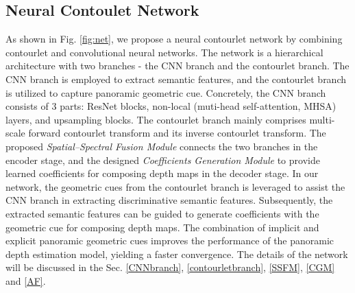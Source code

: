 \documentclass[10pt,times,mathptm,psfig,twocolumn,journals]{IEEEtran}
\begin{document}
\subsection{Neural Contoulet Network}
\label{NCN}
As shown in Fig. \ref{fig:net}, we propose a neural contourlet network by combining contourlet and convolutional neural networks. The network is a hierarchical architecture with two branches - the CNN branch and the contourlet branch. The CNN branch is employed to extract semantic features, and the contourlet branch is utilized to capture panoramic geometric cue. Concretely, the CNN branch consists of 3 parts: ResNet blocks, non-local (muti-head self-attention, MHSA) layers, and upsampling blocks. The contourlet branch mainly comprises multi-scale forward contourlet transform and its inverse contourlet transform. The proposed \textit{Spatial–Spectral Fusion Module} connects the two branches in the encoder stage, and the designed \textit{Coefficients Generation Module} to provide learned coefficients for composing depth maps in the decoder stage. 
In our network, the geometric cues from the contourlet branch is leveraged to assist the CNN branch in extracting discriminative semantic features. Subsequently, the extracted semantic features can be guided to generate coefficients with the geometric cue for composing depth maps.
The combination of implicit and explicit panoramic geometric cues improves the performance of the panoramic depth estimation model, yielding a faster convergence. The details of the network will be discussed in the Sec. \ref{CNNbranch}, \ref{contourletbranch}, \ref{SSFM}, \ref{CGM} and \ref{AF}.
\end{document}
